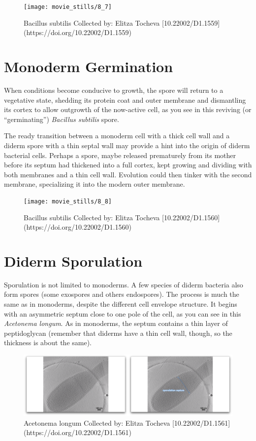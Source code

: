 \documentclass[]{tufte-book}
\begin{document}
\begin{figure}
\texttt{[image: movie\_stills/8\_7]} \caption[Bacillus subtilis Collected by]{Bacillus subtilis Collected by: Elitza Tocheva [10.22002/D1.1559](https://doi.org/10.22002/D1.1559)}\label{fig:unnamed-chunk-143}
\end{figure}

\section{Monoderm Germination}\label{monoderm-germination}

When conditions become conducive to growth, the spore will return to a
vegetative state, shedding its protein coat and outer membrane and
dismantling its cortex to allow outgrowth of the now-active cell, as you
see in this reviving (or ``germinating'') \emph{Bacillus subtilis}
spore.

The ready transition between a monoderm cell with a thick cell wall and
a diderm spore with a thin septal wall may provide a hint into the
origin of diderm bacterial cells. Perhaps a spore, maybe released
prematurely from its mother before its septum had thickened into a full
cortex, kept growing and dividing with both membranes and a thin cell
wall. Evolution could then tinker with the second membrane, specializing
it into the modern outer membrane.

\begin{figure}
\texttt{[image: movie\_stills/8\_8]} \caption[Bacillus subtilis Collected by]{Bacillus subtilis Collected by: Elitza Tocheva [10.22002/D1.1560](https://doi.org/10.22002/D1.1560)}\label{fig:unnamed-chunk-144}
\end{figure}

\section{Diderm Sporulation}\label{diderm-sporulation}

Sporulation is not limited to monoderms. A few species of diderm
bacteria also form spores (some exospores and others endospores). The
process is much the same as in monoderms, despite the different cell
envelope structure. It begins with an asymmetric septum close to one
pole of the cell, as you can see in this \emph{Acetonema longum}. As in
monoderms, the septum contains a thin layer of peptidoglycan (remember
that diderms have a thin cell wall, though, so the thickness is about
the same).

\begin{figure}
\includegraphics{movie_stills/8_9} \caption[Acetonema longum Collected by]{Acetonema longum Collected by: Elitza Tocheva [10.22002/D1.1561](https://doi.org/10.22002/D1.1561)}\label{fig:unnamed-chunk-145}
\end{figure}
\end{document}
